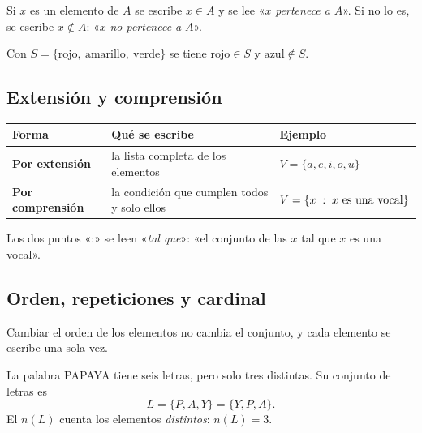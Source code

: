 \documentclass[11pt,a4paper]{article}
\begin{document}
\begin{definicion}[Pertenencia]
Si $x$ es un elemento de $A$ se escribe $x\in A$ y se lee «$x$ \emph{pertenece a} $A$».
Si no lo es, se escribe $x\notin A$: «$x$ \emph{no pertenece a} $A$».
\end{definicion}

\begin{ejemplo}[El semáforo]
Con $S=\{\text{rojo},\ \text{amarillo},\ \text{verde}\}$ se tiene $\text{rojo}\in S$ y $\text{azul}\notin S$.
\end{ejemplo}

\subsection{Extensión y comprensión}
\begin{center}
\begin{tabularx}{\linewidth}{@{}>{\bfseries}l L >{\centering\arraybackslash}p{58mm}@{}}
\toprule
Forma & Qué se escribe & Ejemplo\\ \midrule
Por extensión & la lista completa de los elementos & $V=\{a,e,i,o,u\}$\\
Por comprensión & la condición que cumplen todos y solo ellos & $V=\{x\;:\; x\text{ es una vocal}\}$\\
\bottomrule
\end{tabularx}
\end{center}
Los dos puntos «:» se leen «\emph{tal que}»: «el conjunto de las $x$ tal que $x$ es una vocal».

\subsection{Orden, repeticiones y cardinal}
\begin{propiedad}
Cambiar el orden de los elementos no cambia el conjunto, y cada elemento se escribe una sola vez.
\end{propiedad}
\begin{ejemplo}
La palabra PAPAYA tiene seis letras, pero solo tres distintas. Su conjunto de letras es
\[ L=\{P,A,Y\}=\{Y,P,A\}. \]
El  $n(L)$ cuenta los elementos \emph{distintos}: $n(L)=3$.
\end{ejemplo}

\end{document}
